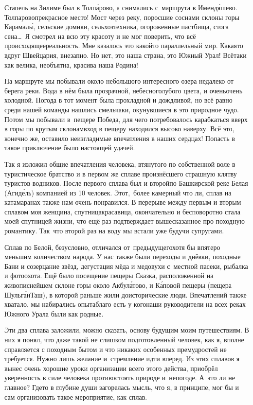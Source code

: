 Стапель на Зилиме был в Толп\'{а}рово, а снимались с~маршрута в Именд\'{я}шево. Толпарово\mdash прекрасное место! Мост через реку, поросшие соснами склоны горы Карамал\'{ы}, сельские домики, сельхозтехника, огороженные пастбища, стога сена\ldots~Я смотрел на всю эту красоту и не мог поверить, что всё происходящее\mdash реальность. Мне казалось это какой\sdash то параллельный мир. Какая\sdash то вдруг Швейцария, внезапно. Но нет, это наша страна, это Южный Урал! Всё\sdash таки как велика, необъятна, красива наша Родина!

На маршруте мы побывали около небольшого интересного озера недалеко от берега реки. Вода в нём была прозрачной, небесно\sdash голубого цвета, и очень\sdash очень холодной. Погода в тот момент была прохладной и дождливой, но всё равно среди нашей команды нашлись смельчаки, окунувшиеся в это природное чудо. Потом мы побывали в~пещере Победа, для чего потребовалось карабкаться вверх в горы по крутым склонам\mdash вход в пещеру находился высоко наверху. Всё это, конечно же, оставило неизгладимые впечатления в наших сердцах! Попасть в такое приключение было настоящей удачей.

Так я изложил общие впечатления человека, втянутого по собственной воле в туристическое братство и в первом же сплаве произнёсшего страшную клятву туристов-водников. После первого сплава был и второй\mdash по Башкирской реке Белая (Агид\'{е}ль) компанией из 10 человек. Этот,~более камерный что ли, сплав на катамаранах также нам очень понравился. В перерыве между первым и вторым сплавом моя женщина, спутница\sdash красавица, окончательно и бесповоротно стала моей спутницей жизни, что ещё раз подтверждает вышесказанное про походную романтику. Так~что второй раз на воду мы встали уже будучи супругами.

Сплав по Белой, безусловно, отличался от~предыдущего\mdash хотя бы впятеро меньшим количеством народа. У нас также были переходы и днёвки, походные Бани и созерцание звёзд, дегустация мёда и медовухи с~местной пасеки, рыбалка и фотоохота. Ещё было посещение пещеры Сказка, расположенной на живописнейшем склоне горы около Акбул\'{а}тово, и К\'{а}повой пещеры (пещера Шульг\'{а}н\sdash Таш), в которой раньше жили доисторические люди. Впечатлений также хватало, мы набирались опыта\mdash благо есть у кого\mdash наши руководители на всех реках Южного Урала были как родные.

Эти два сплава заложили, можно сказать, основу будущим моим путешествиям. В них я понял, что даже такой не слишком подготовленный человек, как я, вполне справляется с походным бытом и что никаких особенных премудростей не требуется. Нужно лишь желание и~стремление идти вперед. Из этих сплавов я вынес очень хорошие уроки организации всего этого действа, приобрёл уверенность в силе человека противостоять природе и~непогоде. А~это ли не главное? Где\sdash то в глубине души загорелась мысль, что я, в принципе, мог бы и сам организовать такое мероприятие, как сплав.

\begin{center}
\end{center}
